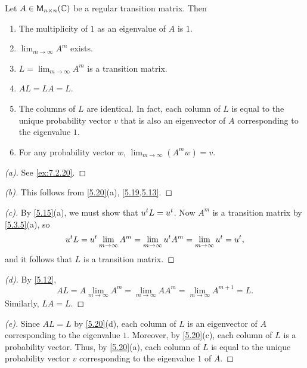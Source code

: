 \begin{thm}\label{5.20}
  Let \(A \in \mathsf{M}_{{n} \times n}({\mathbb{C}})\) be a regular transition matrix.
  Then
  \begin{enumerate}
    \item The multiplicity of \(1\) as an eigenvalue of \(A\) is \(1\).
    \item \(\lim_{m \to \infty} A^m\) exists.
    \item \(L = \lim_{m \to \infty} A^m\) is a transition matrix.
    \item \(AL = LA = L\).
    \item The columns of \(L\) are identical.
          In fact, each column of \(L\) is equal to the unique probability vector \(v\) that is also an eigenvector of \(A\) corresponding to the eigenvalue \(1\).
    \item For any probability vector \(w\), \(\lim_{m \to \infty} (A^m w) = v\).
  \end{enumerate}
\end{thm}

\begin{proof}[(a)]
  See \cref{ex:7.2.20}.
\end{proof}

\begin{proof}[(b)]
  This follows from \cref{5.20}(a), \cref{5.19,5.13}.
\end{proof}

\begin{proof}[(c)]
  By \cref{5.15}(a), we must show that \({u}^{t} L = {u}^{t}\).
  Now \(A^m\) is a transition matrix by \cref{5.3.5}(a), so
  \[
    {u}^{t} L = {u}^{t} \lim_{m \to \infty} A^m = \lim_{m \to \infty} {u}^{t} A^m = \lim_{m \to \infty} {u}^{t} = {u}^{t},
  \]
  and it follows that \(L\) is a transition matrix.
\end{proof}

\begin{proof}[(d)]
  By \cref{5.12},
  \[
    AL = A \lim_{m \to \infty} A^m = \lim_{m \to \infty} AA^m = \lim_{m \to \infty} A^{m + 1} = L.
  \]
  Similarly, \(LA = L\).
\end{proof}

\begin{proof}[(e)]
  Since \(AL = L\) by \cref{5.20}(d), each column of \(L\) is an eigenvector of \(A\) corresponding to the eigenvalue \(1\).
  Moreover, by \cref{5.20}(c), each column of \(L\) is a probability vector.
  Thus, by \cref{5.20}(a), each column of \(L\) is equal to the unique probability vector \(v\) corresponding to the eigenvalue \(1\) of \(A\).
\end{proof}


